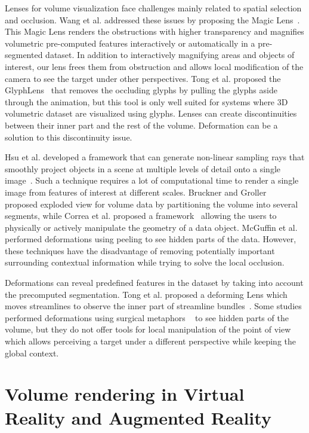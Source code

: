 Lenses for volume visualization face challenges mainly related to spatial selection and occlusion. Wang et al. addressed these issues by proposing the Magic Lens~\cite{1532818}. This Magic Lens renders the obstructions with higher transparency and magnifies volumetric pre-computed features interactively or automatically in a pre-segmented dataset. In addition to interactively magnifying areas and objects of interest, our lens frees them from obstruction and allows local modification of the camera to see the target under other perspectives. Tong et al. proposed the GlyphLens~\cite{7539643} that removes the occluding glyphs by pulling the glyphs aside through the animation, but this tool is only well suited for systems where 3D volumetric dataset are visualized using glyphs. Lenses can create discontinuities between their inner part and the rest of the volume. Deformation can be a solution to this discontinuity issue.   

Hsu et al. developed a framework that can generate non-linear sampling rays that smoothly project objects in a scene at multiple levels of detail onto a single image~\cite{Hsu:2011:RFM:2070781.2024165}. Such a technique requires a lot of computational time to render a single image from features of interest at different scales.
  Bruckner and  Groller~\cite{4015467} proposed exploded view for volume data by partitioning the volume into several segments, while Correa et al. proposed a framework~\cite{Correa:2007:IDD:1313046.1313163} allowing the users to physically or actively manipulate the geometry of a data object. McGuffin et al.~\cite{1250400} performed deformations using peeling to see hidden parts of the data. However, these techniques have the disadvantage of removing potentially important surrounding contextual information while trying to solve the local occlusion. 
 
 
Deformations can reveal predefined features in the dataset by taking into account the precomputed segmentation. Tong et al. proposed a deforming Lens which moves streamlines to observe the inner part of streamline bundles~\cite{7332955}. Some studies performed deformations using surgical metaphors ~\cite{4069230,Correa:2006:FAV:1187627.1187827} to see hidden parts of the volume, but they do not offer tools for local manipulation of the point of view which allows perceiving a target under a different perspective while keeping the global context.


\section{Volume rendering in Virtual Reality and Augmented Reality}

